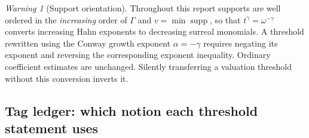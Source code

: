 \documentclass[11pt,letterpaper]{article}
\theoremstyle{definition}
\theoremstyle{remark}
\newtheorem{warning}[warning]{Warning}
\newcommand{\supp}{\operatorname{supp}}
\numberwithin{equation}{section}
\begin{document}
\begin{warning}[Support orientation]\label{dyn:warn:orientation}
Throughout this report supports are well ordered in the \emph{increasing}
order of $\Gamma$ and $v=\min\supp$, so that $t^{\gamma}=\omega^{-\gamma}$
converts increasing Hahn exponents to decreasing surreal monomials. A
threshold rewritten using the Conway growth exponent $\alpha=-\gamma$
requires negating its exponent and reversing the corresponding exponent
inequality. Ordinary coefficient estimates are unchanged. Silently
transferring a valuation threshold without this conversion inverts it.
\end{warning}

\subsection{Tag ledger: which notion each threshold statement uses}
\label{dyn:subsec:theoremtags}
\end{document}
